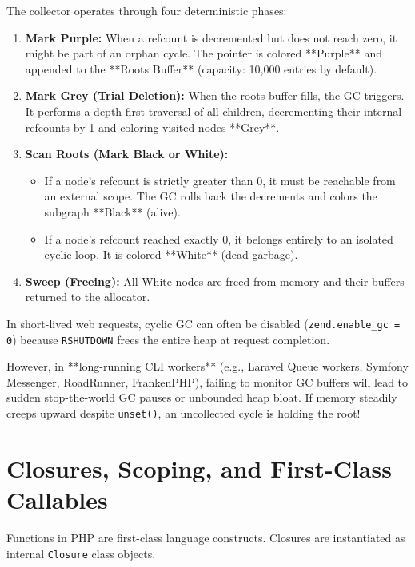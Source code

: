 The collector operates through four deterministic phases:
\begin{enumerate}[leftmargin=15pt]
  \item \textbf{Mark Purple:} When a refcount is decremented but does not reach zero, it might be part of an orphan cycle. The pointer is colored **Purple** and appended to the **Roots Buffer** (capacity: 10,000 entries by default).
  \item \textbf{Mark Grey (Trial Deletion):} When the roots buffer fills, the GC triggers. It performs a depth-first traversal of all children, decrementing their internal refcounts by 1 and coloring visited nodes **Grey**.
  \item \textbf{Scan Roots (Mark Black or White):}
  \begin{itemize}
    \item If a node's refcount is strictly greater than 0, it must be reachable from an external scope. The GC rolls back the decrements and colors the subgraph **Black** (alive).
    \item If a node's refcount reached exactly 0, it belongs entirely to an isolated cyclic loop. It is colored **White** (dead garbage).
  \end{itemize}
  \item \textbf{Sweep (Freeing):} All White nodes are freed from memory and their buffers returned to the allocator.
\end{enumerate}

\begin{productionwarningbox}
In short-lived web requests, cyclic GC can often be disabled (\texttt{zend.enable\_gc = 0}) because \texttt{RSHUTDOWN} frees the entire heap at request completion. 

However, in **long-running CLI workers** (e.g., Laravel Queue workers, Symfony Messenger, RoadRunner, FrankenPHP), failing to monitor GC buffers will lead to sudden stop-the-world GC pauses or unbounded heap bloat. If memory steadily creeps upward despite \texttt{unset()}, an uncollected cycle is holding the root!
\end{productionwarningbox}

\section{Closures, Scoping, and First-Class Callables}

Functions in PHP are first-class language constructs. Closures are instantiated as internal \texttt{Closure} class objects.

